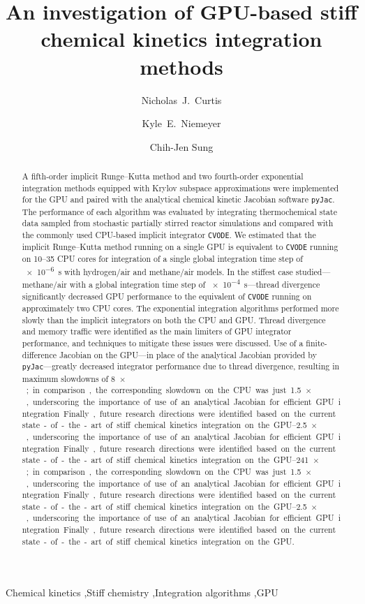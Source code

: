 \documentclass[preprint,review,11pt]{elsarticle}
\begin{document}
\begin{frontmatter}

\title{An investigation of GPU-based stiff chemical kinetics integration methods}

\author[uconn]{Nicholas~J.\ Curtis}
\author[osu]{Kyle~E.\ Niemeyer}
\author[uconn]{Chih-Jen Sung}

\address[uconn]{Department of Mechanical Engineering\\
  University of Connecticut, Storrs, CT, 06269, USA}
\address[osu]{School of Mechanical, Industrial, and Manufacturing Engineering\\
  Oregon State University, Corvallis, OR 97331, USA}
  

\begin{abstract}
A fifth-order implicit Runge--Kutta method and two fourth-order exponential integration methods equipped with Krylov subspace approximations were implemented for the GPU and paired with the analytical chemical kinetic Jacobian software \texttt{pyJac}.
The performance of each algorithm was evaluated by integrating thermochemical state data sampled from stochastic partially stirred reactor simulations and compared with the commonly used CPU-based implicit integrator \texttt{CVODE}.
We estimated that the implicit Runge--Kutta method running on a single GPU is equivalent to \texttt{CVODE} running on \numrange{10}{35} CPU cores for integration of a single global integration time step of \SI{e-6}{\second} with hydrogen\slash air and methane\slash air models.
In the stiffest case studied---methane\slash air with a global integration time step of \SI{e-4}{\second}---thread divergence significantly decreased GPU performance to the equivalent of \texttt{CVODE} running on approximately two CPU cores.
The exponential integration algorithms performed more slowly than the implicit integrators on both the CPU and GPU.
Thread divergence and memory traffic were identified as the main limiters of GPU integrator performance, and techniques to mitigate these issues were discussed.
Use of a finite-difference Jacobian on the GPU---in place of the analytical Jacobian provided by \texttt{pyJac}---greatly decreased integrator performance due to thread divergence, resulting in maximum slowdowns of \SIrange{8}{241}{$\times$}; in comparison, the corresponding slowdown on the CPU was just \SIrange{1.5}{2.5}{$\times$}, underscoring the importance of use of an analytical Jacobian for efficient GPU integration.
Finally, future research directions were identified based on the current state-of-the-art of stiff chemical kinetics integration on the GPU.
\end{abstract}

\begin{keyword}
 Chemical kinetics \sep Stiff chemistry \sep Integration algorithms \sep GPU
\end{keyword}

\end{frontmatter}
\end{document}

